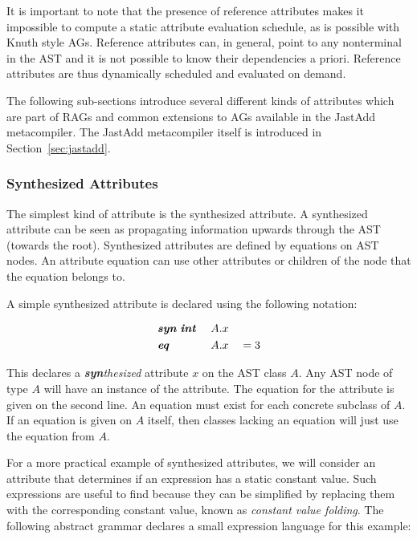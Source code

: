 \documentclass[10pt, twoside, openright]{book}
\newcommand{\secref}[1]{Section~\ref{#1}}
\begin{document}
It is important to note that the presence of reference attributes makes it impossible to compute a
static attribute
evaluation schedule, as is possible with Knuth style AGs. Reference attributes can, in general,
point to any nonterminal in the AST and it is not possible to know their dependencies a priori.
Reference attributes are thus dynamically scheduled and evaluated on demand.

The following sub-sections introduce several different kinds of attributes which
are part of RAGs and common extensions to AGs available in the JastAdd metacompiler.
The JastAdd metacompiler itself is introduced in \secref{sec:jastadd}.


\subsubsection{Synthesized Attributes}

The simplest kind of attribute is the synthesized attribute. A synthesized attribute
can be seen as propagating information upwards through the AST (towards the root). Synthesized attributes are
defined by equations on AST nodes. An attribute equation can use other attributes or
children of the node that the equation belongs to.

A simple synthesized attribute is declared using the following notation:

\begin{alignat*}{3}
& \textbf{\textit{syn}} \; \textbf{\textit{int}} & \; A.&x && \\
& \textbf{\textit{eq}} & \; A.&x &&= 3
\end{alignat*}

\noindent
This declares a \emph{\textbf{syn}thesized} attribute $x$ on the AST class $A$.
Any AST node of type $A$ will have an instance of the attribute.
The equation for the attribute is given on the second line. An equation must exist for
each concrete subclass of $A$. If an equation is given on $A$ itself, then classes lacking an
equation will just use the equation from $A$.

For a more practical example of synthesized attributes, we will consider an attribute that determines if an
expression has a static constant value. Such expressions are useful to find
because they can be simplified by replacing them with the corresponding constant value, known as \emph{constant value folding}.
The following abstract grammar declares a small expression language for this example:

\end{document}
